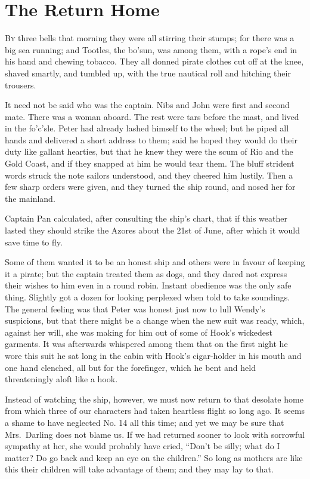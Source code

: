 \chapter{The Return Home}

\lettrine{B}{y} three bells that morning they were all stirring their stumps; for
there was a big sea running; and Tootles, the bo'sun, was among them,
with a rope's end in his hand and chewing tobacco. They all donned
pirate clothes cut off at the knee, shaved smartly, and tumbled up,
with the true nautical roll and hitching their trousers.

It need not be said who was the captain. Nibs and John were first and
second mate. There was a woman aboard. The rest were tars before the
mast, and lived in the fo'c'sle. Peter had already lashed himself to
the wheel; but he piped all hands and delivered a short address to
them; said he hoped they would do their duty like gallant hearties, but
that he knew they were the scum of Rio and the Gold Coast, and if they
snapped at him he would tear them. The bluff strident words struck the
note sailors understood, and they cheered him lustily. Then a few sharp
orders were given, and they turned the ship round, and nosed her for
the mainland.

Captain Pan calculated, after consulting the ship's chart, that if this
weather lasted they should strike the Azores about the 21st of June,
after which it would save time to fly.

Some of them wanted it to be an honest ship and others were in favour
of keeping it a pirate; but the captain treated them as dogs, and they
dared not express their wishes to him even in a round robin. Instant
obedience was the only safe thing. Slightly got a dozen for looking
perplexed when told to take soundings. The general feeling was that
Peter was honest just now to lull Wendy's suspicions, but that there
might be a change when the new suit was ready, which, against her will,
she was making for him out of some of Hook's wickedest garments. It was
afterwards whispered among them that on the first night he wore this
suit he sat long in the cabin with Hook's cigar-holder in his mouth and
one hand clenched, all but for the forefinger, which he bent and held
threateningly aloft like a hook.

Instead of watching the ship, however, we must now return to that
desolate home from which three of our characters had taken heartless
flight so long ago. It seems a shame to have neglected No. 14 all this
time; and yet we may be sure that Mrs.\ Darling does not blame us. If we
had returned sooner to look with sorrowful sympathy at her, she would
probably have cried, ``Don't be silly; what do I matter? Do go back and
keep an eye on the children.'' So long as mothers are like this their
children will take advantage of them; and they may lay to that.

